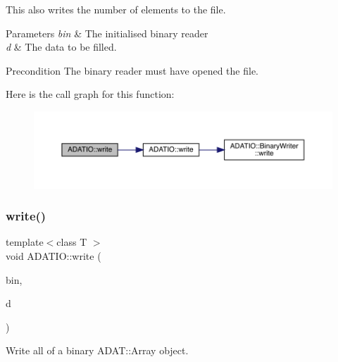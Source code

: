 This also writes the number of elements to the file. 
\begin{DoxyParams}{Parameters}
{\em bin} & The initialised binary reader \\
\hline
{\em d} & The data to be filled.\\
\hline
\end{DoxyParams}
\begin{DoxyPrecond}{Precondition}
The binary reader must have opened the file. 
\end{DoxyPrecond}
Here is the call graph for this function\+:\nopagebreak
\begin{figure}[H]
\begin{center}
\leavevmode
\includegraphics[width=350pt]{d0/dba/namespaceADATIO_a940fb003df0f6107d020341f78592201_cgraph}
\end{center}
\end{figure}
\mbox{\label{namespaceADATIO_aea9e3ff6a488ce22e363d16085c76a85}} 
\subsubsection{\texorpdfstring{write()}{write()}\hspace{0.1cm}{\footnotesize\ttfamily [23/25]}}
{\footnotesize\ttfamily template$<$class T $>$ \\
void A\+D\+A\+T\+I\+O\+::write (\begin{DoxyParamCaption}\item[{\mbox{\hyperlink{classADATIO_1_1BinaryWriter}{Binary\+Writer}} \&}]{bin,  }\item[{const \mbox{\hyperlink{classADAT_1_1Array1dO}{A\+D\+A\+T\+::\+Array1dO}}$<$ T $>$ \&}]{d }\end{DoxyParamCaption})\hspace{0.3cm}{\ttfamily [inline]}}



Write all of a binary A\+D\+A\+T\+::\+Array object. 

